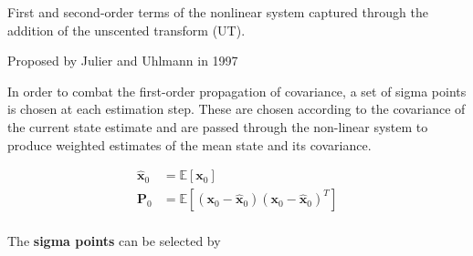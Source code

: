First and second-order terms of the nonlinear system captured through the
addition of the unscented transform (UT).

Proposed by Julier and Uhlmann in 1997~\cite{Julier1997}

\cite{Wan2000, Wan2001}
In order to combat the first-order propagation of covariance, a set of sigma
points is chosen at each estimation step. These are chosen according to the
covariance of the current state estimate and are passed through the non-linear
system to produce weighted estimates of the mean state and its covariance.

\begin{equation}
    \begin{aligned}
        \hat{\bm{x}}_0 &= \mathbb{E}[\bm{x}_0]                                             \\
        \bm{P}_0       &= \mathbb{E}[(\bm{x}_0-\hat{\bm{x}}_0)(\bm{x}_0-\hat{\bm{x}}_0)^T] \\
    \end{aligned}
\end{equation}

\cite{Cheng2011}
The \textbf{sigma points} can be selected by

